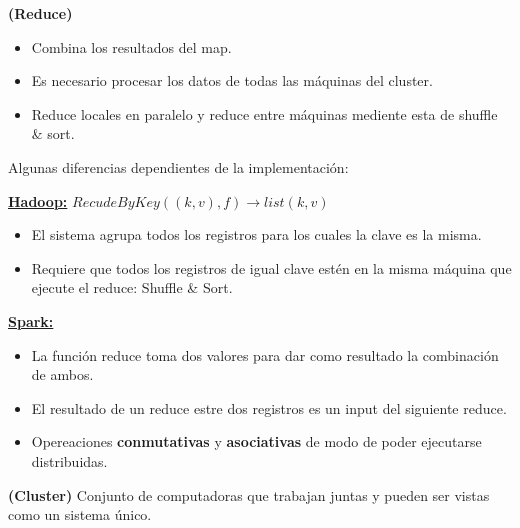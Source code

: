 \documentclass[../main.tex]{subfiles}
\begin{document}
    \begin{definition} \textbf{(Reduce)}
        \begin{itemize}
            \item Combina los resultados del map.
            \item Es necesario procesar los datos de todas las máquinas del cluster.
            \item Reduce locales en paralelo y reduce entre máquinas mediente esta de shuffle \& sort.
        \end{itemize}

        Algunas diferencias dependientes de la implementación:
        
        \underline{\textbf{Hadoop:}} $RecudeByKey((k, v), f) \rightarrow list(k, v)$
        \begin{itemize}
            \item El sistema agrupa todos los registros para los cuales la clave es la misma.
            \item Requiere que todos los registros de igual clave estén en la misma máquina que ejecute el reduce: Shuffle \& Sort.
        \end{itemize}

        \underline{\textbf{Spark:}}
        \begin{itemize}
            \item La función reduce toma dos valores para dar como resultado la combinación de ambos.
            \item El resultado de un reduce estre dos registros es un input del siguiente reduce.
            \item Opereaciones \textbf{conmutativas} y \textbf{asociativas} de modo de poder ejecutarse distribuidas.
        \end{itemize}
    
    \end{definition}

    \begin{definition} \textbf{(Cluster)}
        Conjunto de computadoras que trabajan juntas y pueden ser vistas como un sistema único.
    \end{definition}
\end{document}
